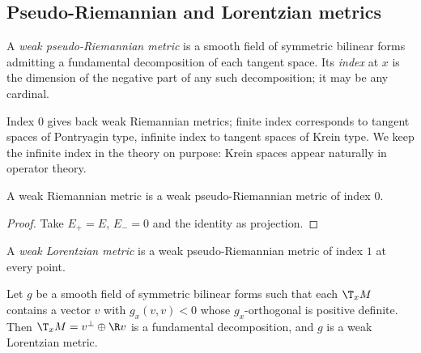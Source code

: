 \subsection{Pseudo-Riemannian and Lorentzian metrics}

\begin{definition}
  \label{def:weak-pseudo-riemannian}
  \leanok
  A \emph{weak pseudo-Riemannian metric} is a smooth field of symmetric bilinear forms admitting a
  fundamental decomposition of each tangent space. Its \emph{index} at $x$ is the dimension of the
  negative part of any such decomposition; it may be any cardinal.
\end{definition}

Index $0$ gives back weak Riemannian metrics; finite index corresponds to tangent spaces of
Pontryagin type, infinite index to tangent spaces of Krein type. We keep the infinite index in the
theory on purpose: Krein spaces appear naturally in operator theory.

\begin{proposition}
  \label{prop:mt-riemannian-index}
  \leanok
  A weak Riemannian metric is a weak pseudo-Riemannian metric of index $0$.
\end{proposition}

\begin{proof}
  \leanok
  Take $E_+ = E$, $E_- = 0$ and the identity as projection.
\end{proof}

\begin{definition}
  \label{def:weak-lorentzian}
  \leanok
  A \emph{weak Lorentzian metric} is a weak pseudo-Riemannian metric of index $1$ at every point.
\end{definition}

\begin{theorem}
  \label{thm:mt-timelike}
  \leanok
  Let $g$ be a smooth field of symmetric bilinear forms such that each $\T_x M$ contains a vector $v$
  with $g_x(v,v) < 0$ whose $g_x$-orthogonal is positive definite. Then $\T_x M = v^\perp \oplus \R v$
  is a fundamental decomposition, and $g$ is a weak Lorentzian metric.
\end{theorem}

